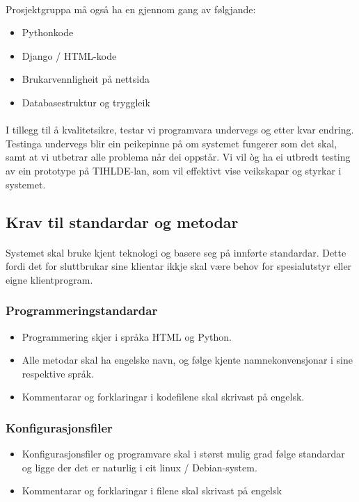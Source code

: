 \documentclass[nynorsk,12pt,a4paper]{article}
\begin{document}
\paragraph{}
Prosjektgruppa må også ha en gjennom gang av følgjande:
\begin{itemize}	
	\item Pythonkode
	\item Django / HTML-kode
	\item Brukarvennligheit på nettsida
	\item Databasestruktur og tryggleik
\end{itemize}

\paragraph{}
I tillegg til å kvalitetsikre, testar vi programvara undervegs og etter kvar endring. Testinga undervegs blir ein peikepinne på om systemet fungerer som det skal, samt at vi utbetrar alle problema når dei oppstår. Vi vil òg ha ei utbredt testing av ein prototype på TIHLDE{}-lan, som vil effektivt vise veikskapar og styrkar i systemet.

\subsection{Krav til standardar og metodar}
\paragraph{}
Systemet skal bruke kjent teknologi og basere seg på innførte standardar. Dette fordi det for sluttbrukar sine klientar ikkje skal være behov for spesialutstyr eller eigne klientprogram. 

\subsubsection{Programmeringstandardar}
\begin{itemize}
	\item Programmering skjer i språka HTML og Python.
	\item Alle metodar skal ha engelske navn, og følge kjente namnekonvensjonar i sine respektive språk.
	\item Kommentarar og forklaringar i kodefilene skal skrivast på engelsk.
\end{itemize}

\subsubsection{Konfigurasjonsfiler}
\begin{itemize}
	\item Konfigurasjonsfiler og programvare skal i størst mulig grad følge standardar og ligge der det er naturlig i eit linux / Debian{}-system.
	\item Kommentarar og forklaringar i filene skal skrivast på engelsk
\end{itemize}
\end{document}
